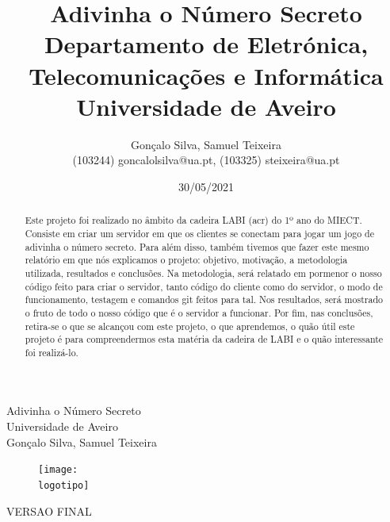 \documentclass{report}
\begin{document}
%
\def\titulo{Adivinha o Número Secreto}
\def\data{30/05/2021}
\def\autores{Gonçalo Silva, Samuel Teixeira}
\def\autorescontactos{(103244) goncalolsilva@ua.pt, (103325) steixeira@ua.pt}
\def\versao{VERSAO FINAL}
\def\departamento{Departamento de Eletrónica, Telecomunicações e Informática}
\def\empresa{Universidade de Aveiro}
\def\logotipo{ua.pdf}
%
%
\renewcommand{\contentsname}{Índice}
\begin{titlepage}

\begin{center}
%
\vspace*{50mm}
%
{\Huge \titulo}\\ 
%
\vspace{10mm}
%
{\Large \empresa}\\
%
\vspace{10mm}
%
{\LARGE \autores}\\ 
%
\vspace{30mm}
%
\begin{figure}[h]
\center
\texttt{[image: \\logotipo]}
\end{figure}
%
\vspace{30mm}
\end{center}
%
\begin{flushright}
\versao
\end{flushright}
\end{titlepage}

\title{%
{\Huge\textbf{\titulo}}\\
{\Large \departamento\\ \empresa}
}
%
\author{%
    \autores \\
    \autorescontactos
}
%
\date{\data}
%
\maketitle


\begin{abstract}
Este projeto foi realizado no âmbito da cadeira LABI (acr) do 1º ano do MIECT.
Consiste em criar um servidor em que os clientes se conectam para jogar um jogo de
adivinha o número secreto. Para além disso, também tivemos que fazer este mesmo 
relatório em que nós explicamos o projeto: objetivo, motivação, a metodologia utilizada, resultados e
conclusões. Na metodologia, será relatado em pormenor o nosso código feito para criar o servidor, tanto
código do cliente como do servidor, o modo de funcionamento, testagem e comandos git feitos para tal.
Nos resultados, será mostrado o fruto de todo o nosso código que é o servidor a funcionar.
Por fim, nas conclusões, retira-se o que se alcançou com este projeto, o que aprendemos,
o quão útil este projeto é para compreendermos esta matéria da cadeira de LABI e o 
quão interessante foi realizá-lo.
\end{abstract}
\end{document}
